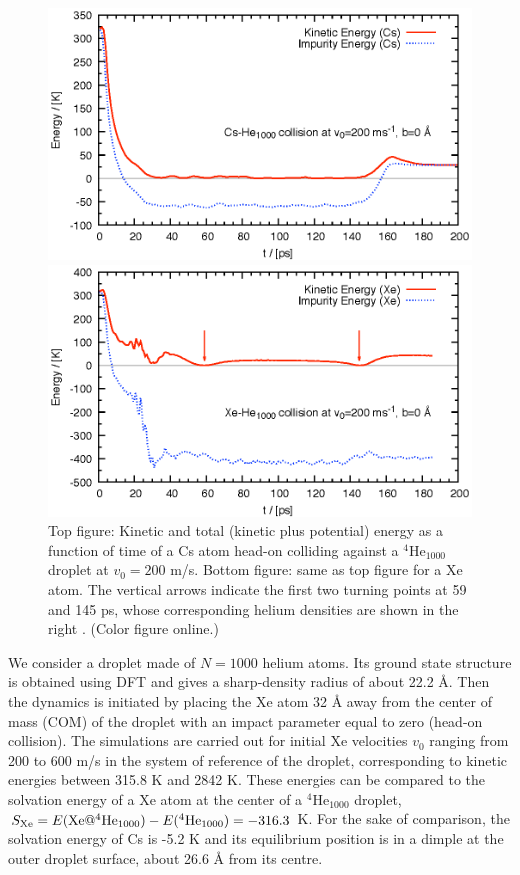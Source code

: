 		\begin{figure}[!]
			\centerline{\includegraphics[width=0.90\linewidth,clip]{fig3-Cs-He}} 
			\centerline{\includegraphics[width=0.90\linewidth,clip]{fig3-Xe-He}}
			\caption{\label{fig3-headon}Top figure: Kinetic and total (kinetic plus potential) energy as a function of time  of a Cs atom head-on colliding against a  $^4$He$_{1000}$ droplet at  $v_0 = 200$ m/s. Bottom figure: same as top figure for a Xe atom. The vertical arrows indicate the first two turning points at 59 and 145 ps, whose corresponding helium densities are shown in the right . (Color figure online.)}
		\end{figure}

		We consider a droplet made of $N=1000$ helium atoms. Its ground state structure is obtained using DFT and gives a sharp-density  radius of about 22.2 \AA{}. Then the dynamics is initiated by placing the Xe atom 32 \AA{} away from the center of mass (COM) of the droplet with an impact parameter equal to zero (head-on collision). The simulations are carried out for initial Xe velocities  $v_0$ ranging from 200 to  600 m/s in the system of reference of the droplet, corresponding to kinetic energies between  315.8 K and  2842 K. These energies can be compared to the solvation energy of a Xe atom at the center of a $^4$He$_{1000}$ droplet, $S_{{\rm Xe}} = E({\rm Xe}@^4{\rm He}_{1000}) - E(^4{\rm He}_{1000}) = -316.3$ K. For the sake of comparison, the solvation energy of Cs is -5.2 K and its equilibrium position is  in a dimple at the outer droplet surface, about 26.6 \AA{} from its centre. 

